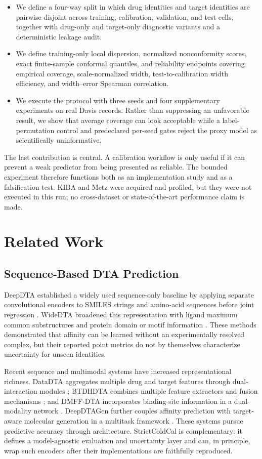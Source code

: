 \documentclass[lettersize,journal]{IEEEtran}
\begin{document}
\begin{itemize}
\item We define a four-way split in which drug identities and target identities are pairwise disjoint across training, calibration, validation, and test cells, together with drug-only and target-only diagnostic variants and a deterministic leakage audit.
\item We define training-only local dispersion, normalized nonconformity scores, exact finite-sample conformal quantiles, and reliability endpoints covering empirical coverage, scale-normalized width, test-to-calibration width efficiency, and width--error Spearman correlation.
\item We execute the protocol with three seeds and four supplementary experiments on real Davis records. Rather than suppressing an unfavorable result, we show that average coverage can look acceptable while a label-permutation control and predeclared per-seed gates reject the proxy model as scientifically uninformative.
\end{itemize}

The last contribution is central. A calibration workflow is only useful if it can prevent a weak predictor from being presented as reliable. The bounded experiment therefore functions both as an implementation study and as a falsification test. KIBA and Metz were acquired and profiled, but they were not executed in this run; no cross-dataset or state-of-the-art performance claim is made.

\section{Related Work}

\subsection{Sequence-Based DTA Prediction}
DeepDTA established a widely used sequence-only baseline by applying separate convolutional encoders to SMILES strings and amino-acid sequences before joint regression \cite{deepdta}. WideDTA broadened this representation with ligand maximum common substructures and protein domain or motif information \cite{widedta}. These methods demonstrated that affinity can be learned without an experimentally resolved complex, but their reported point metrics do not by themselves characterize uncertainty for unseen identities.

Recent sequence and multimodal systems have increased representational richness. DataDTA aggregates multiple drug and target features through dual-interaction modules \cite{datadta}; BTDHDTA combines multiple feature extractors and fusion mechanisms \cite{btdhdta}; and DMFF-DTA incorporates binding-site information in a dual-modality network \cite{dmffdta}. DeepDTAGen further couples affinity prediction with target-aware molecular generation in a multitask framework \cite{deepdtagen}. These systems pursue predictive accuracy through architecture. StrictColdCal is complementary: it defines a model-agnostic evaluation and uncertainty layer and can, in principle, wrap such encoders after their implementations are faithfully reproduced.
\end{document}
